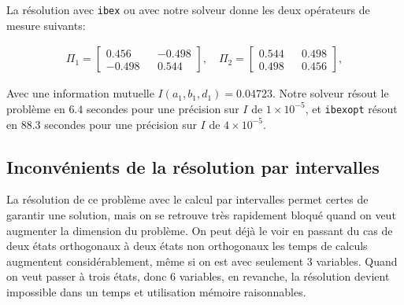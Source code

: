\documentclass[12pt,a4paper]{article}
\begin{document}
    La résolution avec \texttt{ibex} ou avec notre solveur donne les deux opérateurs de mesure suivants: 

    \begin{align}
        \Pi_1 = \begin{bmatrix}0.456 && -0.498 \\ -0.498 && 0.544\end{bmatrix}, \quad \Pi_2 = \begin{bmatrix}0.544 && 0.498 \\ 0.498 && 0.456\end{bmatrix},
    \end{align}

    Avec une information mutuelle $I(a_1, b_1, d_1) = 0.04723$. Notre solveur résout le problème en $6.4$ secondes pour une précision sur $I$ de $1 \times 10^{-5}$, et \texttt{ibexopt} résout en $88.3$ secondes pour une précision sur $I$ de $4\times 10^{-5}$.



    \subsection*{Inconvénients de la résolution par intervalles}
    La résolution de ce problème avec le calcul par intervalles permet certes de garantir une solution, mais on se retrouve très rapidement bloqué quand on veut augmenter la dimension du problème. On peut déjà le voir en passant du cas de deux états orthogonaux à deux états non orthogonaux les temps de calculs augmentent considérablement, même si on est avec seulement 3 variables. Quand on veut passer à trois états, donc 6 variables, en revanche, la résolution devient impossible dans un temps et utilisation mémoire raisonnables. 
\end{document}
